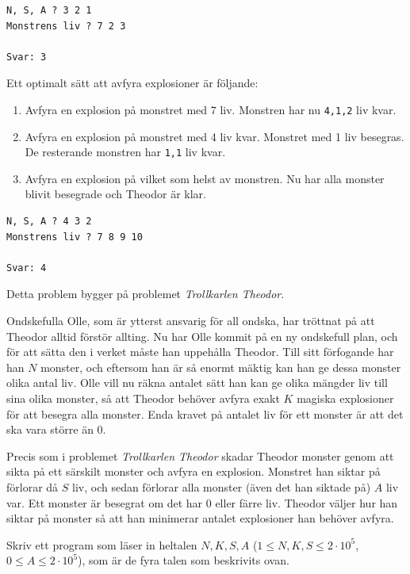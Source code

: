 \begin{verbatim}
N, S, A ? 3 2 1
Monstrens liv ? 7 2 3

Svar: 3
\end{verbatim}
 Ett optimalt sätt att avfyra explosioner är följande:
\begin{enumerate}
  \item Avfyra en explosion på monstret med 7 liv. Monstren har nu \verb+4,1,2+ liv kvar.
  \item Avfyra en explosion på monstret med 4 liv kvar. Monstret med 1 liv besegras. De resterande monstren har \verb+1,1+ liv kvar. 
  \item Avfyra en explosion på vilket som helst av monstren. Nu har alla monster blivit besegrade och Theodor är klar.
\end{enumerate}


\begin{verbatim}
N, S, A ? 4 3 2
Monstrens liv ? 7 8 9 10

Svar: 4  
\end{verbatim}




Detta problem bygger på problemet \textit{Trollkarlen Theodor}.

Ondskefulla Olle, som är ytterst ansvarig för all ondska, har tröttnat på att Theodor alltid förstör allting.
Nu har Olle kommit på en ny ondskefull plan, och för att sätta den i verket måste han uppehålla Theodor.
Till sitt förfogande har han $N$ monster, och eftersom han är så enormt mäktig kan han ge dessa monster olika antal liv.
Olle vill nu räkna antalet sätt han kan ge olika mängder liv till sina olika monster, 
så att Theodor behöver avfyra exakt $K$ magiska explosioner för att besegra alla monster. Enda kravet på antalet liv
för ett monster är att det ska vara större än $0$.

Precis som i problemet \textit{Trollkarlen Theodor} skadar Theodor monster genom att sikta på ett särskilt monster och avfyra
en explosion. Monstret han siktar på förlorar då $S$ liv, och sedan förlorar alla monster (även det han siktade på) $A$ liv var. 
Ett monster är besegrat om det har 0 eller färre liv.
Theodor väljer hur han siktar på monster så att han minimerar antalet explosioner han behöver avfyra.

Skriv ett program som läser in heltalen $N, K, S, A$ ($1 \leq N,K,S \leq 2\cdot10^5$, $0 \leq A \leq 2\cdot10^5$), som är de fyra talen som beskrivits ovan.

